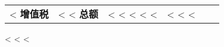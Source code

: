 \begin{CJK}{UTF8}{arialuni}
\begin{longtable}{|lp{5.5cm} @{\extracolsep\fill} rrrl|}
<%
  \multicolumn{5}{|lr} \textbf{增值税} & <%
<%
	\hline
  \multicolumn{5}{|rr} \textbf{总额} & <%
  \hline
\endlastfoot
<%
  <%
    <%
  <%
		& <%
	<%
<%
\end{longtable}

\parbox{\textwidth}{
\vspace{0.5cm}
<%
  <%
<%
}

\vfill


\vspace{1cm}
\end{CJK}
